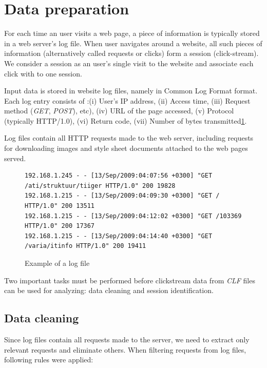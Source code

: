 \documentclass[12pt, english,a4paper]{article}
\begin{document}
\section{Data preparation} 
For each time an user visits a web page, a piece of information is typically stored in a web server's log file. When user navigates around a website, all such pieces of information (alternatively called requests or clicks) form a session (click-stream). We consider a session as an user's single visit to the website and associate each click with to one session.

Input data is stored in website log files, namely in Common Log Format\cite{ref_clf} format. Each log entry consists of :(i) User's IP address, (ii) Access time, (iii) Request method (\emph{GET}, \emph{POST}), etc), (iv) URL of the page accessed, (v) Protocol (typically HTTP/1.0), (vi) Return code, (vii) Number of bytes transmitted\ref{log_sample}.

Log files contain all HTTP requests made to the web server, including requests for downloading images and style sheet documents attached to the web pages served.

\begin{figure}[h]
{\tiny
\begin{verbatim}
192.168.1.245 - - [13/Sep/2009:04:07:56 +0300] "GET /ati/struktuur/tiiger HTTP/1.0" 200 19828
192.168.1.215 - - [13/Sep/2009:04:09:30 +0300] "GET / HTTP/1.0" 200 13511
192.168.1.215 - - [13/Sep/2009:04:12:02 +0300] "GET /103369 HTTP/1.0" 200 17367
192.168.1.215 - - [13/Sep/2009:04:14:40 +0300] "GET /varia/itinfo HTTP/1.0" 200 19411
\end{verbatim}
}
\label{log_sample}
\caption{Example of a log file}
\end{figure}

Two important tasks must be performed before clickstream data from \emph{CLF} files can be used for analyzing: data cleaning and session identification.







\subsection{Data cleaning}
Since log files contain all requests made to the server, we need to extract only relevant requests and eliminate others. When filtering requests from log files, following rules were applied:
\end{document}
